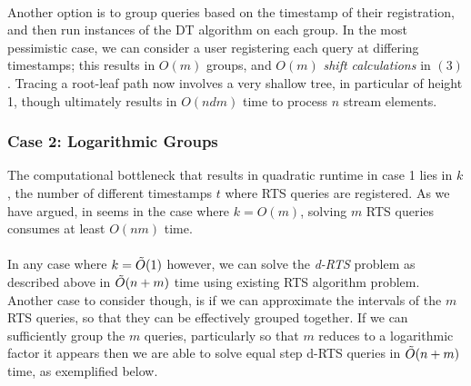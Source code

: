\documentclass{article}
\begin{document}
\\
Another option is to group queries based on the timestamp of their registration, and then run instances of the DT algorithm on each group. In the most pessimistic case, we can consider a user registering each query at differing timestamps; this results in $O(m)$ groups, and $O(m)$ \textit{shift calculations} in $(3)$. Tracing a root-leaf path now involves a very shallow tree, in particular of height 1, though ultimately results in $O(ndm)$ time to process $n$ stream elements.

\subsubsection*{Case 2: Logarithmic Groups}
The computational bottleneck that results in quadratic runtime in case 1 lies in $k$, the number of different timestamps $t$ where RTS queries are registered. As we have argued, in seems in the case where $k = O(m)$, solving $m$ RTS queries consumes at least $O(nm)$ time. \\
\\
In any case where $k = \Tilde{O}(1)$ however, we can solve the \textit{d-RTS} problem as described above in $\Tilde{O}(n+m)$ time using existing RTS algorithm problem. Another case to consider though, is if we can approximate the intervals of the $m$ RTS queries, so that they can be effectively grouped together. If we can sufficiently group the $m$ queries, particularly so that $m$ reduces to a logarithmic factor it appears then we are able to solve equal step d-RTS queries in $\Tilde{O}(n+m)$ time, as exemplified below.
\end{document}
